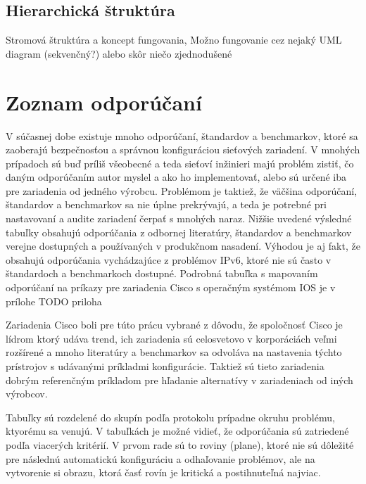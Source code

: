  

\subsection*{Hierarchická štruktúra}
Stromová štruktúra a koncept fungovania, Možno fungovanie cez nejaký UML diagram (sekvenčný?) alebo skôr niečo zjednodušené

\section{Zoznam odporúčaní}

V súčasnej dobe existuje mnoho odporúčaní, štandardov a benchmarkov, ktoré sa zaoberajú bezpečnosťou a správnou konfiguráciou sieťových zariadení. V mnohých prípadoch sú buď príliš všeobecné a teda sieťoví inžinieri majú problém zistiť, čo daným odporúčaním autor myslel a ako ho implementovať, alebo sú určené iba pre zariadenia od jedného výrobcu. Problémom je taktiež, že väčšina odporúčaní, štandardov a benchmarkov sa nie úplne prekrývajú, a teda je potrebné pri nastavovaní a audite zariadení čerpať s mnohých naraz. Nižšie uvedené výsledné tabuľky obsahujú odporúčania z odbornej literatúry, štandardov a benchmarkov verejne dostupných a používaných v produkčnom nasadení. Výhodou je aj fakt, že obsahujú odporúčania vychádzajúce z problémov IPv6, ktoré nie sú často v štandardoch a benchmarkoch dostupné. Podrobná tabuľka s mapovaním odporúčaní na príkazy pre zariadenia Cisco s operačným systémom IOS je v prílohe TODO priloha %

Zariadenia Cisco boli pre túto prácu vybrané z dôvodu, že spoločnosť Cisco je lídrom ktorý udáva trend, ich zariadenia sú celosvetovo v korporáciách veľmi rozšírené a mnoho literatúry a benchmarkov sa odvoláva na nastavenia týchto prístrojov s udávanými príkladmi konfigurácie. Taktiež sú tieto zariadenia dobrým referenčným príkladom pre hľadanie alternatívy v zariadeniach od iných výrobcov.

Tabuľky sú rozdelené do skupín podľa protokolu prípadne okruhu problému, ktyorému sa venujú. V tabuľkách je možné vidieť, že odporúčania sú zatriedené podľa viacerých kritérií. V prvom rade sú to roviny (plane), ktoré nie sú dôležité pre následnú automatickú konfiguráciu a odhaľovanie problémov, ale na vytvorenie si obrazu, ktorá časť rovín je kritická a postihnuteľná najviac. 

